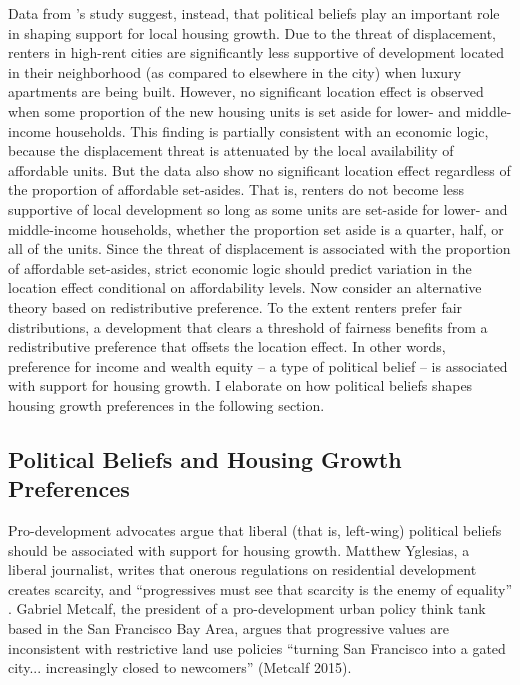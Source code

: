 \documentclass[article,11pt]{memoir}
\begin{document}
Data from \citeauthor{hankinson_when_2018}'s study suggest, instead, that political beliefs play an important role in shaping support for local housing growth. Due to the threat of displacement, renters in high-rent cities are significantly less supportive of development located in their neighborhood (as compared to elsewhere in the city) when luxury apartments are being built. However, no significant location effect is observed when some proportion of the new housing units is set aside for lower- and middle-income households. This finding is partially consistent with an economic logic, because the displacement threat is attenuated by the local availability of affordable units. But the data also show no significant location effect regardless of the proportion of affordable set-asides. That is, renters do not become less supportive of local development so long as some units are set-aside for lower- and middle-income households, whether the proportion set aside is a quarter, half, or all of the units. Since the threat of displacement is associated with the proportion of affordable set-asides, strict economic logic should predict variation in the location effect conditional on affordability levels. Now consider an alternative theory based on redistributive preference. To the extent renters prefer fair distributions, a development that clears a threshold of fairness benefits from a redistributive preference that offsets the location effect. In other words, preference for income and wealth equity -- a type of political belief -- is associated with support for housing growth. I elaborate on how political beliefs shapes housing growth preferences in the following section.

\subsection{Political Beliefs and Housing Growth Preferences}

Pro-development advocates argue that liberal (that is, left-wing) political beliefs should be associated with support for housing growth. Matthew Yglesias, a liberal journalist, writes that onerous regulations on residential development creates scarcity, and ``progressives must see that scarcity is the enemy of equality'' \citep{yglesias_rent_2012}.  Gabriel Metcalf, the president of a pro-development urban policy think tank based in the San Francisco Bay Area, argues that progressive values are inconsistent with restrictive land use policies ``turning San Francisco into a gated city... increasingly closed to newcomers'' (Metcalf 2015). 
\end{document}
